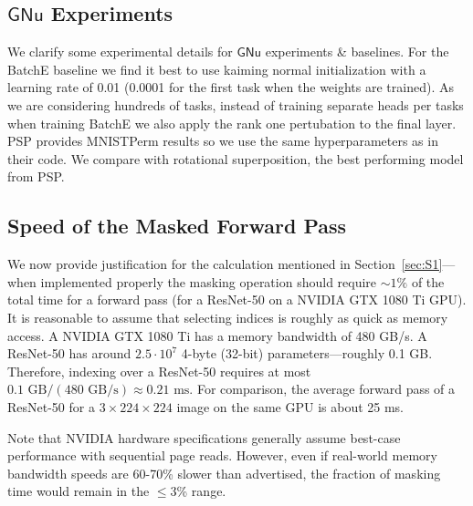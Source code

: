 \documentclass{article}
\newcommand{\casename}[1]{\ensuremath{\mathsf{#1}}\xspace}
\begin{document}
\subsection{\casename{GNu} Experiments}
We clarify some experimental details for \casename{GNu} experiments \& baselines. For the BatchE \cite{wen2020batchensemble} baseline we find it best to use kaiming normal initialization with a learning rate of 0.01 (0.0001 for the first task when the weights are trained). As we are considering hundreds of tasks, instead of training separate heads per tasks when training BatchE we also apply the rank one pertubation to the final layer. PSP \cite{cheung2019superposition} provides MNISTPerm results so we use the same hyperparameters as in their code. We compare with rotational superposition, the best performing model from PSP.

\subsection{Speed of the Masked Forward Pass}

We now provide justification for the calculation mentioned in Section~\ref{sec:S1}---when implemented properly the masking operation should require $\sim 1\%$ of the total time for a forward pass (for a ResNet-50 on a NVIDIA GTX 1080 Ti GPU). It is reasonable to assume that selecting indices is roughly as quick as memory access. A NVIDIA GTX 1080 Ti has a memory bandwidth of 480 GB/s. A ResNet-50 has around $2.5\cdot 10^7$ 4-byte (32-bit) parameters---roughly 0.1 GB. Therefore, indexing over a ResNet-50 requires at most $0.1 \text{ GB} / \left(480\text{ GB/s}\right) \approx 0.21\text{ ms}$. For comparison, the average forward pass of a ResNet-50 for a $3\times 224\times 224$ image on the same GPU is about 25 ms. 

Note that NVIDIA hardware specifications generally assume best-case performance with sequential page reads. However, even if real-world memory bandwidth speeds are 60-70\% slower than advertised, the fraction of masking time would remain in the $\leq 3$\% range.
\end{document}
